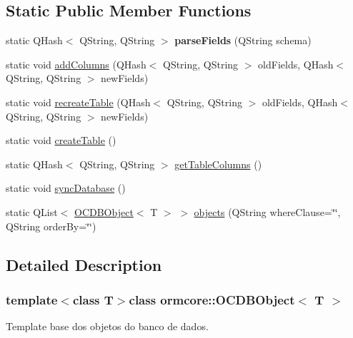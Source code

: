 \subsection*{\-Static \-Public \-Member \-Functions}
\begin{DoxyCompactItemize}
\item 
\hypertarget{classormcore_1_1_o_c_d_b_object_acedb1136e415338d607b7edef6037409}{
static \-Q\-Hash$<$ \-Q\-String, \-Q\-String $>$ {\bfseries parse\-Fields} (\-Q\-String schema)}
\label{classormcore_1_1_o_c_d_b_object_acedb1136e415338d607b7edef6037409}

\item 
static void \hyperlink{classormcore_1_1_o_c_d_b_object_a128132815ade97882e2300743779e46a}{add\-Columns} (\-Q\-Hash$<$ \-Q\-String, \-Q\-String $>$ old\-Fields, \-Q\-Hash$<$ \-Q\-String, \-Q\-String $>$ new\-Fields)
\item 
static void \hyperlink{classormcore_1_1_o_c_d_b_object_a36815ad0bdadcabfdf3ed84e2411e9c1}{recreate\-Table} (\-Q\-Hash$<$ \-Q\-String, \-Q\-String $>$ old\-Fields, \-Q\-Hash$<$ \-Q\-String, \-Q\-String $>$ new\-Fields)
\item 
static void \hyperlink{classormcore_1_1_o_c_d_b_object_a18c394209bf0e80082d884842ea9630a}{create\-Table} ()
\item 
static \-Q\-Hash$<$ \-Q\-String, \-Q\-String $>$ \hyperlink{classormcore_1_1_o_c_d_b_object_ad32aef4a69a116a0fa7ebf7d704d3506}{get\-Table\-Columns} ()
\item 
static void \hyperlink{classormcore_1_1_o_c_d_b_object_a2f72c86621c10110a70ffed11033c38c}{sync\-Database} ()
\item 
static \-Q\-List$<$ \hyperlink{classormcore_1_1_o_c_d_b_object}{\-O\-C\-D\-B\-Object}$<$ \-T $>$ $>$ \hyperlink{classormcore_1_1_o_c_d_b_object_a0617a472caa17e9ca3da70c7386b885c}{objects} (\-Q\-String where\-Clause=\char`\"{}\char`\"{}, \-Q\-String order\-By=\char`\"{}\char`\"{})
\end{DoxyCompactItemize}


\subsection{\-Detailed \-Description}
\subsubsection*{template$<$class \-T$>$class ormcore\-::\-O\-C\-D\-B\-Object$<$ T $>$}

\-Template base dos objetos do banco de dados. 

